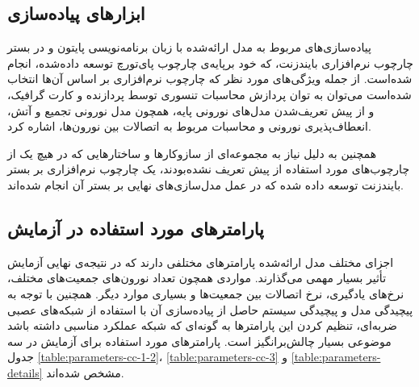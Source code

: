 \documentclass[12pt]{report}
\begin{document}
	\subsection{ابزار‌های پیاده‌سازی}
	
	پیاده‌سازی‌های مربوط به مدل ارائه‌شده با زبان برنامه‌نویسی پایتون و در بستر چارچوب نرم‌افزاری بایندزنت، که خود برپایه‌ی چارچوب پای‌تورچ توسعه داده‌شده‌، انجام شده‌است. از جمله ویژگی‌های مورد نظر که چارچوب نرم‌افزاری بر اساس آن‌ها انتخاب شده‌است می‌توان به توان پردازش محاسبات تنسوری توسط پردازنده و کارت گرافیک، و از پیش تعریف‌شدن مدل‌های نورونی پایه، همچون مدل نورونی تجمیع و آتش، انعطاف‌پذیری نورونی و محاسبات مربوط به اتصالات بین نورون‌ها، اشاره کرد.
	
	همچنین به دلیل نیاز به مجموعه‌ای از سازوکار‌ها و ساختارهایی که در هیچ یک از چارچوب‌های مورد‌ استفاده از پیش تعریف نشده‌بودند، یک چارچوب نرم‌افزاری بر بستر بایندزنت توسعه داده شده‌ که در عمل مدل‌سازی‌های نهایی بر بستر آن انجام شده‌اند.
	
	\subsection{پارامتر‌های مورد استفاده در آزمایش}
	اجزای مختلف مدل ارائه‌شده پارامتر‌های مختلفی دارند که در نتیجه‌ی نهایی آزمایش تأثیر بسیار مهمی می‌گذارند. مواردی همچون تعداد نورون‌های جمعیت‌های مختلف، نرخ‌های یادگیری، نرخ اتصالات بین جمعیت‌ها و بسیاری موارد دیگر. همچنین با توجه به پیچیدگی مدل و پیچیدگی سیستم حاصل از پیاده‌سازی آن با استفاده از شبکه‌های عصبی ضربه‌ای، تنظیم کردن این پارامتر‌ها به گونه‌ای که شبکه عملکرد مناسبی داشته باشد موضوعی بسیار چالش‌برانگیز است. پارامتر‌های مورد استفاده برای آزمایش در سه جدول \ref{table:parameters-cc-1-2}، \ref{table:parameters-cc-3} و \ref{table:parameters-details} مشخص شده‌اند.
\end{document}
